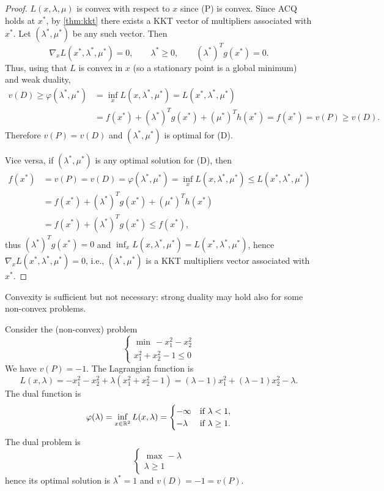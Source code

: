 \begin{proof}
    $L(x, \lambda, \mu)$ is convex with respect to $x$ since (P) is convex. Since ACQ holds at $x^*$, by \cref{thm:kkt} there exists a KKT vector of multipliers associated with $x^*$. Let $(\lambda^*, \mu^*)$ be any such vector. Then
    \[
        \nabla_x L(x^*, \lambda^*, \mu^*) = 0, \qquad \lambda^* \ge 0, \qquad (\lambda^*)^Tg(x^*) = 0.
    \]
    Thus, using that $L$ is convex in $x$ (so a stationary point is a global minimum) and weak duality,
    \[
        \begin{aligned}
            v(D) \ge \varphi(\lambda^*, \mu^*) &= \inf_x L(x, \lambda^*, \mu^*) = L(x^*, \lambda^*, \mu^*)\\
            &= f(x^*) + (\lambda^*)^Tg(x^*) + (\mu^*)^Th(x^*) = f(x^*) = v(P) \ge v(D).
        \end{aligned}
    \]
    Therefore $v(P) = v(D)$ and $(\lambda^*, \mu^*)$ is optimal for (D).

    Vice versa, if $(\lambda^*, \mu^*)$ is any optimal solution for (D), then
    \[
        \begin{aligned}
            f(x^*) &= v(P) = v(D) = \varphi(\lambda^*, \mu^*) = \inf_x L(x, \lambda^*, \mu^*) \le L(x^*, \lambda^*, \mu^*)\\
            &= f(x^*) + (\lambda^*)^Tg(x^*) + (\mu^*)^Th(x^*)\\
            &= f(x^*) + (\lambda^*)^Tg(x^*) \le f(x^*),
        \end{aligned}
    \]
    thus $(\lambda^*)^Tg(x^*) = 0$ and $\inf_x L(x, \lambda^*, \mu^*) = L(x^*, \lambda^*, \mu^*)$, hence $\nabla_x L(x^*, \lambda^*, \mu^*) = 0$, i.e., $(\lambda^*, \mu^*)$ is a KKT multipliers vector associated with $x^*$.
\end{proof}

Convexity is sufficient but not necessary: strong duality may hold also for some non-convex problems.

\begin{example}
    Consider the (non-convex) problem
    \[
        \begin{cases}
            \min\, -x_1^2 - x_2^2\\
            x_1^2 + x_2^2 - 1 \le 0
        \end{cases}
    \]
    We have $v(P) = -1$. The Lagrangian function is
    \[
        L(x, \lambda) = -x_1^2 - x_2^2 + \lambda(x_1^2 + x_2^2 - 1) = (\lambda - 1)x_1^2 + (\lambda - 1)x_2^2 - \lambda.
    \]
    The dual function is
    \[
        \varphi(\lambda) = \inf_{x \in \mathbb{R}^2} L(x, \lambda) =
        \begin{cases}
            -\infty & \text{if } \lambda < 1,\\
            -\lambda & \text{if } \lambda \ge 1.
        \end{cases}
    \]
    The dual problem is
    \[
        \begin{cases}
            \max\, -\lambda\\
            \lambda \ge 1
        \end{cases}
    \]
    hence its optimal solution is $\lambda^* = 1$ and $v(D) = -1 = v(P)$.
\end{example}

